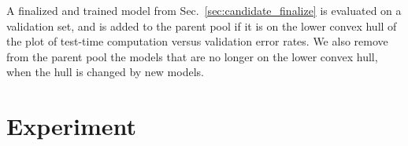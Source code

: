 A finalized and trained model from Sec.~\ref{sec:candidate_finalize} is evaluated on a validation set, and is added to the parent pool if it is on the lower convex hull of the plot of test-time computation versus validation error rates. We also remove from the parent pool the models that are no longer on the lower convex hull, when the hull is changed by new models. 
    
\section{Experiment}
\label{sec:nas_experiment}








